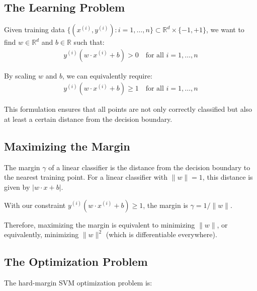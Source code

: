\documentclass{article}
\begin{document}
\subsection{The Learning Problem}
Given training data $\{(x^{(i)}, y^{(i)}): i=1,\ldots,n\} \subset \mathbb{R}^d \times \{-1, +1\}$, we want to find $w \in \mathbb{R}^d$ and $b \in \mathbb{R}$ such that:
\begin{align}
y^{(i)}(w \cdot x^{(i)} + b) > 0 \quad \text{for all } i=1,\ldots,n
\end{align}

By scaling $w$ and $b$, we can equivalently require:
\begin{align}
y^{(i)}(w \cdot x^{(i)} + b) \geq 1 \quad \text{for all } i=1,\ldots,n
\end{align}

This formulation ensures that all points are not only correctly classified but also at least a certain distance from the decision boundary.

\subsection{Maximizing the Margin}
The margin $\gamma$ of a linear classifier is the distance from the decision boundary to the nearest training point. For a linear classifier with $\|w\| = 1$, this distance is given by $|w \cdot x + b|$.

With our constraint $y^{(i)}(w \cdot x^{(i)} + b) \geq 1$, the margin is $\gamma = 1/\|w\|$.

Therefore, maximizing the margin is equivalent to minimizing $\|w\|$, or equivalently, minimizing $\|w\|^2$ (which is differentiable everywhere).

\subsection{The Optimization Problem}
The hard-margin SVM optimization problem is:

\end{document}
